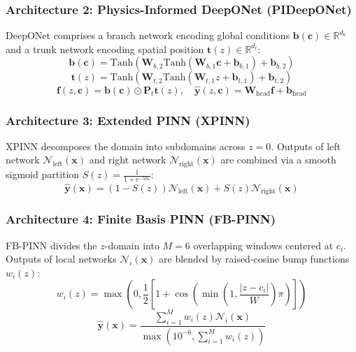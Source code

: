 \documentclass[3p,preprint,12pt,numbers,square,sort&compress]{elsarticle}
\begin{document}
\subsubsection{Architecture 2: Physics-Informed DeepONet (PIDeepONet)}
DeepONet comprises a branch network encoding global conditions $\mathbf{b}(\mathbf{c}) \in \mathbb{R}^{d_b}$ and a trunk network encoding spatial position $\mathbf{t}(z) \in \mathbb{R}^{d_t}$:
\begin{equation}
    \mathbf{b}(\mathbf{c}) = \text{Tanh}\left(\mathbf{W}_{b,2} \text{Tanh}\left(\mathbf{W}_{b,1} \mathbf{c} + \mathbf{b}_{b,1}\right) + \mathbf{b}_{b,2}\right)
\end{equation}
\begin{equation}
    \mathbf{t}(z) = \text{Tanh}\left(\mathbf{W}_{t,2} \text{Tanh}\left(\mathbf{W}_{t,1} z + \mathbf{b}_{t,1}\right) + \mathbf{b}_{t,2}\right)
\end{equation}
\begin{equation}
    \mathbf{f}(z, \mathbf{c}) = \mathbf{b}(\mathbf{c}) \odot \mathbf{P}_t \mathbf{t}(z), \quad \hat{\mathbf{y}}(z, \mathbf{c}) = \mathbf{W}_{\text{head}} \mathbf{f} + \mathbf{b}_{\text{head}}
\end{equation}

\subsubsection{Architecture 3: Extended PINN (XPINN)}
XPINN decomposes the domain into subdomains across $z=0$. Outputs of left network $\mathcal{N}_{\text{left}}(\mathbf{x})$ and right network $\mathcal{N}_{\text{right}}(\mathbf{x})$ are combined via a smooth sigmoid partition $S(z) = \frac{1}{1 + e^{-50z}}$:
\begin{equation}
    \hat{\mathbf{y}}(\mathbf{x}) = (1 - S(z)) \mathcal{N}_{\text{left}}(\mathbf{x}) + S(z) \mathcal{N}_{\text{right}}(\mathbf{x})
\end{equation}

\subsubsection{Architecture 4: Finite Basis PINN (FB-PINN)}
FB-PINN divides the $z$-domain into $M=6$ overlapping windows centered at $c_i$. Outputs of local networks $\mathcal{N}_i(\mathbf{x})$ are blended by raised-cosine bump functions $w_i(z)$:
\begin{equation}
    w_i(z) = \max\left(0, \frac{1}{2}\left[1 + \cos\left( \min\left(1, \frac{|z - c_i|}{W}\right) \pi \right)\right]\right)
\end{equation}
\begin{equation}
    \hat{\mathbf{y}}(\mathbf{x}) = \frac{\sum_{i=1}^{M} w_i(z) \mathcal{N}_i(\mathbf{x})}{\max\left(10^{-6}, \sum_{i=1}^{M} w_i(z)\right)}
\end{equation}
\end{document}
